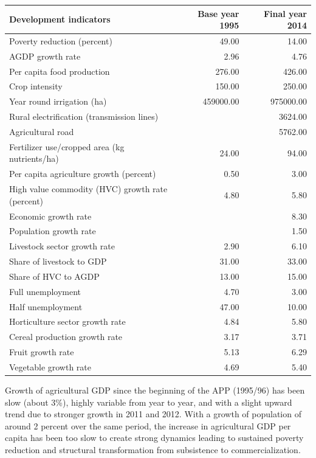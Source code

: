 \documentclass[
  openany]{book}
\begin{document}
\begin{table}[H]
\centering\begingroup\fontsize{10}{12}\selectfont

\begin{tabular}{>{\raggedright\arraybackslash}p{12em}rr}
\toprule
Development indicators & Base year 1995 & Final year 2014\\
\midrule
\rowcolor{gray!6}  Poverty reduction (percent) & 49.00 & 14.00\\
AGDP growth rate & 2.96 & 4.76\\
\rowcolor{gray!6}  Per capita food production & 276.00 & 426.00\\
Crop intensity & 150.00 & 250.00\\
\rowcolor{gray!6}  Year round irrigation (ha) & 459000.00 & 975000.00\\
\addlinespace
Rural electrification (transmission lines) &  & 3624.00\\
\rowcolor{gray!6}  Agricultural road &  & 5762.00\\
Fertilizer use/cropped area (kg nutrients/ha) & 24.00 & 94.00\\
\rowcolor{gray!6}  Per capita agriculture growth (percent) & 0.50 & 3.00\\
High value commodity (HVC) growth rate (percent) & 4.80 & 5.80\\
\addlinespace
\rowcolor{gray!6}  Economic growth rate &  & 8.30\\
Population growth rate &  & 1.50\\
\rowcolor{gray!6}  Livestock sector growth rate & 2.90 & 6.10\\
Share of livestock to GDP & 31.00 & 33.00\\
\rowcolor{gray!6}  Share of HVC to AGDP & 13.00 & 15.00\\
\addlinespace
Full unemployment & 4.70 & 3.00\\
\rowcolor{gray!6}  Half unemployment & 47.00 & 10.00\\
Horticulture sector growth rate & 4.84 & 5.80\\
\rowcolor{gray!6}  Cereal production growth rate & 3.17 & 3.71\\
Fruit growth rate & 5.13 & 6.29\\
\addlinespace
\rowcolor{gray!6}  Vegetable growth rate & 4.69 & 5.40\\
\bottomrule
\end{tabular}
\endgroup{}
\end{table}

Growth of agricultural GDP since the beginning of the APP (1995/96) has been slow (about 3\%), highly variable from year to year, and with a slight upward trend due to stronger growth in 2011 and 2012. With a growth of population of around 2 percent over the same period, the increase in agricultural GDP per capita has been too slow to create strong dynamics leading to sustained poverty reduction and structural transformation from subsistence to commercialization.
\end{document}
